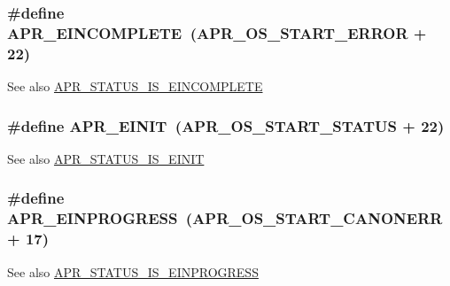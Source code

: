 \subsubsection[{\texorpdfstring{A\+P\+R\+\_\+\+E\+I\+N\+C\+O\+M\+P\+L\+E\+TE}{APR_EINCOMPLETE}}]{\setlength{\rightskip}{0pt plus 5cm}\#define A\+P\+R\+\_\+\+E\+I\+N\+C\+O\+M\+P\+L\+E\+TE~({\bf A\+P\+R\+\_\+\+O\+S\+\_\+\+S\+T\+A\+R\+T\+\_\+\+E\+R\+R\+OR} + 22)}\hypertarget{group___a_p_r___error_gab4357bcbdc2922183e0594865b59ce58}{}\label{group___a_p_r___error_gab4357bcbdc2922183e0594865b59ce58}
\begin{DoxySeeAlso}{See also}
\hyperlink{group___a_p_r___s_t_a_t_u_s___i_s_gaeac4146f667ea793fae6058516694194}{A\+P\+R\+\_\+\+S\+T\+A\+T\+U\+S\+\_\+\+I\+S\+\_\+\+E\+I\+N\+C\+O\+M\+P\+L\+E\+TE} 
\end{DoxySeeAlso}
\subsubsection[{\texorpdfstring{A\+P\+R\+\_\+\+E\+I\+N\+IT}{APR_EINIT}}]{\setlength{\rightskip}{0pt plus 5cm}\#define A\+P\+R\+\_\+\+E\+I\+N\+IT~({\bf A\+P\+R\+\_\+\+O\+S\+\_\+\+S\+T\+A\+R\+T\+\_\+\+S\+T\+A\+T\+US} + 22)}\hypertarget{group___a_p_r___error_gaacd087793c97a3493eafc14075775b82}{}\label{group___a_p_r___error_gaacd087793c97a3493eafc14075775b82}
\begin{DoxySeeAlso}{See also}
\hyperlink{group___a_p_r___s_t_a_t_u_s___i_s_ga2941899b37db907199696d523521742e}{A\+P\+R\+\_\+\+S\+T\+A\+T\+U\+S\+\_\+\+I\+S\+\_\+\+E\+I\+N\+IT} 
\end{DoxySeeAlso}
\subsubsection[{\texorpdfstring{A\+P\+R\+\_\+\+E\+I\+N\+P\+R\+O\+G\+R\+E\+SS}{APR_EINPROGRESS}}]{\setlength{\rightskip}{0pt plus 5cm}\#define A\+P\+R\+\_\+\+E\+I\+N\+P\+R\+O\+G\+R\+E\+SS~({\bf A\+P\+R\+\_\+\+O\+S\+\_\+\+S\+T\+A\+R\+T\+\_\+\+C\+A\+N\+O\+N\+E\+RR} + 17)}\hypertarget{group___a_p_r___error_ga5c311361f4f68f289c90f3cdfd77eb79}{}\label{group___a_p_r___error_ga5c311361f4f68f289c90f3cdfd77eb79}
\begin{DoxySeeAlso}{See also}
\hyperlink{group___a_p_r___s_t_a_t_u_s___i_s_ga30122cce19f6c245f9491b95d0c66777}{A\+P\+R\+\_\+\+S\+T\+A\+T\+U\+S\+\_\+\+I\+S\+\_\+\+E\+I\+N\+P\+R\+O\+G\+R\+E\+SS} 
\end{DoxySeeAlso}
